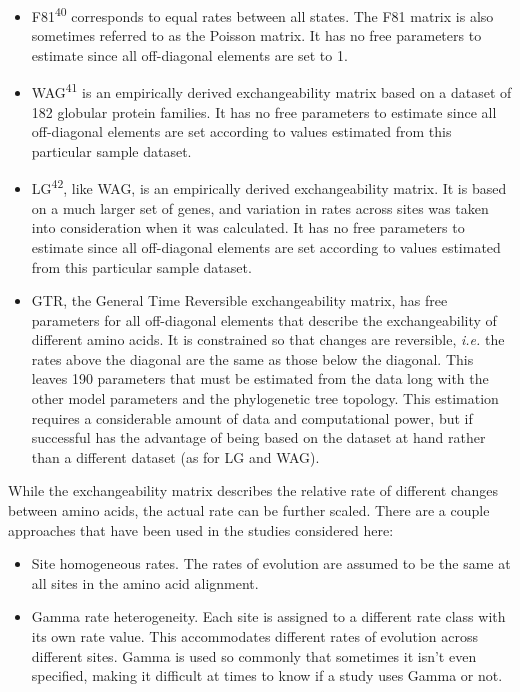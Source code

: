 \documentclass[]{article}
\begin{document}
\begin{itemize}
\item
  F81\textsuperscript{40} corresponds to equal rates between all states.
  The F81 matrix is also sometimes referred to as the Poisson matrix. It
  has no free parameters to estimate since all off-diagonal elements are
  set to 1.
\item
  WAG\textsuperscript{41} is an empirically derived exchangeability
  matrix based on a dataset of 182 globular protein families. It has no
  free parameters to estimate since all off-diagonal elements are set
  according to values estimated from this particular sample dataset.
\item
  LG\textsuperscript{42}, like WAG, is an empirically derived
  exchangeability matrix. It is based on a much larger set of genes, and
  variation in rates across sites was taken into consideration when it
  was calculated. It has no free parameters to estimate since all
  off-diagonal elements are set according to values estimated from this
  particular sample dataset.
\item
  GTR, the General Time Reversible exchangeability matrix, has free
  parameters for all off-diagonal elements that describe the
  exchangeability of different amino acids. It is constrained so that
  changes are reversible, \emph{i.e.} the rates above the diagonal are
  the same as those below the diagonal. This leaves 190 parameters that
  must be estimated from the data long with the other model parameters
  and the phylogenetic tree topology. This estimation requires a
  considerable amount of data and computational power, but if successful
  has the advantage of being based on the dataset at hand rather than a
  different dataset (as for LG and WAG).
\end{itemize}

While the exchangeability matrix describes the relative rate of
different changes between amino acids, the actual rate can be further
scaled. There are a couple approaches that have been used in the studies
considered here:

\begin{itemize}
\item
  Site homogeneous rates. The rates of evolution are assumed to be the
  same at all sites in the amino acid alignment.
\item
  Gamma rate heterogeneity. Each site is assigned to a different rate
  class with its own rate value. This accommodates different rates of
  evolution across different sites. Gamma is used so commonly that
  sometimes it isn't even specified, making it difficult at times to
  know if a study uses Gamma or not.
\end{itemize}
\end{document}
